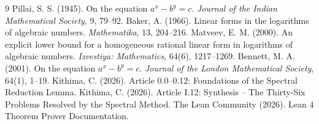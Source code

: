\documentclass[11pt,a4paper]{article}
\begin{document}

\begin{thebibliography}{9}
  Pillai, S. S. (1945). On the equation $a^x - b^y = c$. \emph{Journal of the Indian Mathematical Society}, 9, 79–92.
  Baker, A. (1966). Linear forms in the logarithms of algebraic numbers. \emph{Mathematika}, 13, 204–216.
  Matveev, E. M. (2000). An explicit lower bound for a homogeneous rational linear form in logarithms of algebraic numbers. \emph{Izvestiya: Mathematics}, 64(6), 1217–1269.
  Bennett, M. A. (2001). On the equation $a^x - b^y = c$. \emph{Journal of the London Mathematical Society}, 64(1), 1–19.
  Kithima, C. (2026). Article 0.0–0.12: Foundations of the Spectral Reduction Lemma.
  Kithima, C. (2026). Article I.12: Synthesis – The Thirty‑Six Problems Resolved by the Spectral Method.
  The Lean Community (2026). Lean 4 Theorem Prover Documentation.
\end{thebibliography}
\end{document}
